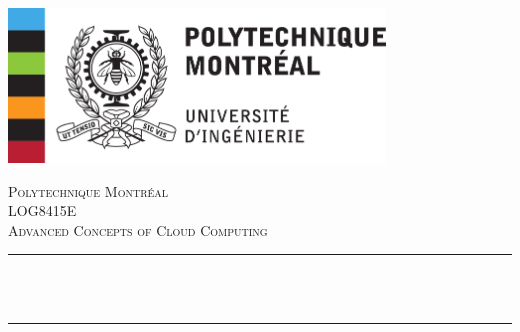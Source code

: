 \begin{titlepage}

\newcommand{\HRule}{\rule{\linewidth}{0.5mm}} %

\center
\includegraphics[width=10cm]{Title/polytechnique.png}\\[1cm] %
 

\center %


\textsc{\LARGE Polytechnique Montréal }\\[1.5cm] %
\textsc{\Large LOG8415E}\\[0.5cm] %
\textsc{\large Advanced Concepts of Cloud Computing}\\[1.5cm] %

\makeatletter
\HRule \\[0.4cm]
{ \huge \bfseries \@title}\\[0.4cm] %
\HRule \\[1.5cm]
 


\end{titlepage}
